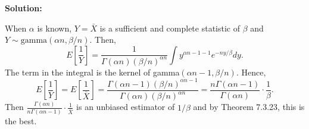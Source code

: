 \documentclass[11pt]{article}
\newcommand{\Sol}{\par {\bf Solution:}}
\begin{document}
\Sol

When $\alpha$ is known, $Y = \bar X$ is a sufficient and complete statistic of $\beta$ and $Y \sim \text{gamma}(\alpha n, \beta/n)$.
Then,
\[
E[\frac{1}{Y}] = \frac{1}{\Gamma(\alpha n){(\beta/n)}^{\alpha n}} \int y^{\alpha n - 1 - 1}e^{-ny/\beta} dy.
\]
The term in the integral is the kernel of gamma$(\alpha n - 1, \beta/n)$. Hence,
\[
E[\frac{1}{Y}] = E[\frac{1}{\bar X}] = \frac{\Gamma(\alpha n - 1){(\beta/n)}^{\alpha n - 1}}{\Gamma(\alpha n){(\beta/n)}^{\alpha n }} = \frac{n\Gamma(\alpha n - 1)}{\Gamma(\alpha n)} \cdot \frac{1}{\beta}.
\]
Then $\frac{\Gamma(\alpha n)}{n\Gamma(\alpha n - 1)}\cdot \frac{1}{\bar X}$ is an unbiased estimator of $1/\beta$ and by Theorem 7.3.23, this is the best.
\end{document}
